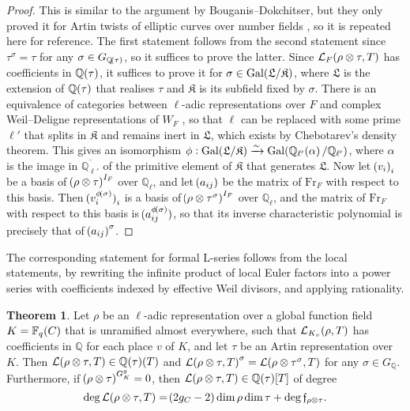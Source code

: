 \documentclass{article}
\theoremstyle{definition}
\newtheorem{theorem}[n]{Theorem}
\theoremstyle{definition}
\newcommand{\FF}{\mathbb{F}}
\newcommand{\ffff}{\mathfrak{f}}
\newcommand{\Fr}{\mathrm{Fr}}
\newcommand{\Gal}{\mathrm{Gal}}
\newcommand{\KKKK}{\mathfrak{K}}
\newcommand{\LLL}{\mathcal{L}}
\newcommand{\LLLL}{\mathfrak{L}}
\newcommand{\QQ}{\mathbb{Q}}
\newcommand{\br}{\!\del[0]}
\begin{document}
\begin{proof}
This is similar to the argument by Bouganis--Dokchitser, but they only proved it for Artin twists of elliptic curves over number fields \cite[Lemma 4.4]{BD07}, so it is repeated here for reference. The first statement follows from the second statement since $ \tau^\sigma = \tau $ for any $ \sigma \in G_{\QQ\br{\tau}} $, so it suffices to prove the latter. Since $ \LLL_F\br{\rho \otimes \tau, T} $ has coefficients in $ \QQ\br{\tau} $, it suffices to prove it for $ \sigma \in \Gal\br{\LLLL / \KKKK} $, where $ \LLLL $ is the extension of $ \QQ\br{\tau} $ that realises $ \tau $ and $ \KKKK $ is its subfield fixed by $ \sigma $. There is an equivalence of categories between $ \ell $-adic representations over $ F $ and complex Weil--Deligne representations of $ W_F $ \cite[Section 8]{Del73}, so that $ \ell $ can be replaced with some prime $ \ell' $ that splits in $ \KKKK $ and remains inert in $ \LLLL $, which exists by Chebotarev's density theorem. This gives an isomorphism $ \phi : \Gal\br{\LLLL / \KKKK} \xrightarrow{\sim} \Gal\br{\QQ_{\ell'}\br{\alpha} / \QQ_{\ell'}} $, where $ \alpha $ is the image in $ \overline{\QQ_{\ell'}} $ of the primitive element of $ \KKKK $ that generates $ \LLLL $. Now let $ \br{v_i}_i $ be a basis of $ \br{\rho \otimes \tau}^{I_F} $ over $ \QQ_\ell $, and let $ \br{a_{ij}} $ be the matrix of $ \Fr_F $ with respect to this basis. Then $ \br{v_i^{\phi\br{\sigma}}}_i $ is a basis of $ \br{\rho \otimes \tau^\sigma}^{I_F} $ over $ \QQ_\ell $, and the matrix of $ \Fr_F $ with respect to this basis is $ \br{a_{ij}^{\phi\br{\sigma}}} $, so that its inverse characteristic polynomial is precisely that of $ \br{a_{ij}}^\sigma $.
\end{proof}

The corresponding statement for formal L-series follows from the local statements, by rewriting the infinite product of local Euler factors into a power series with coefficients indexed by effective Weil divisors, and applying rationality.

\begin{theorem}
\label{thm:global}
Let $ \rho $ be an $ \ell $-adic representation over a global function field $ K = \FF_q\br{C} $ that is unramified almost everywhere, such that $ \LLL_{K_v}\br{\rho, T} $ has coefficients in $ \QQ $ for each place $ v $ of $ K $, and let $ \tau $ be an Artin representation over $ K $. Then $ \LLL\br{\rho \otimes \tau, T} \in \QQ\br{\tau}\br{T} $ and $ \LLL\br{\rho \otimes \tau, T}^\sigma = \LLL\br{\rho \otimes \tau^\sigma, T} $ for any $ \sigma \in G_\QQ $. Furthermore, if $ \br{\rho \otimes \tau}^{G_K^g} = 0 $, then $ \LLL\br{\rho \otimes \tau, T} \in \QQ\br{\tau}\sbr{T} $ of degree
$$ \deg\LLL\br{\rho \otimes \tau, T} = \br{2g_C - 2}\dim\rho\dim\tau + \deg\ffff_{\rho \otimes \tau}. $$
\end{theorem}
\end{document}
